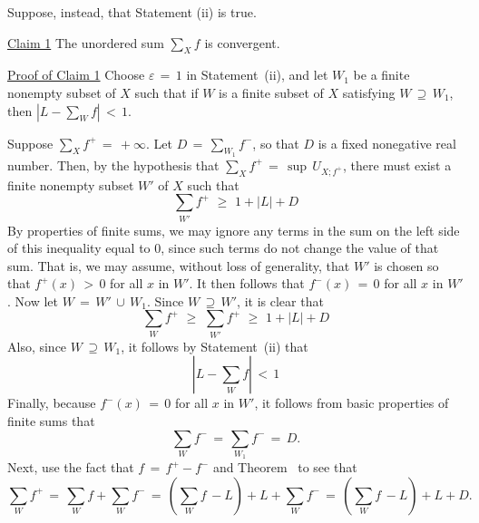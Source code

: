 \V

        Suppose, instead, that Statement (ii) is true.

        \underline{Claim 1} The unordered sum ${\sum}_{X} f$ is convergent.

        \underline{Proof of Claim 1} Choose ${\varepsilon} \,=\, 1$ in Statement~(ii),
    and let $W_{1}$ be a finite nonempty subset of $X$ such that if $W$ is a finite subset of $X$ satisfying $W \,{\supseteq}\, W_{{1}}$,
    then $\left|L-{\sum}_{W} f\right|\,<\,1$.

        Suppose ${\sum}_{X} f^{+} \,=\, +{\infty}$. Let $D \,=\, {\sum}_{W_{1}} f^{-}$, so that $D$ is a fixed nonegative real number.
    Then, by the hypothesis that
        ${\displaystyle {\sum}_{X} f^{+} \,=\, {\sup}\,U_{X;f^{+}}}$,
 there must exist a finite nonempty subset $W'$ of $X$ such that
        \begin{displaymath}
        {\sum}_{W'} f^{+}\,\,{\geq}\,\,1+|L| + D
        \end{displaymath}
    By properties of finite sums, we may ignore any terms in the sum on the left side of this inequality equal to $0$,
    since such terms do not change the value of that sum.
    That is, we may assume, without loss of generality, that $W'$ is chosen so that $f^{+}(x)\,>\,0$ for all $x$ in $W'$.
    It then follows that $f^{-}(x) \,=\, 0$ for all $x$ in $W'$.
    Now let $W \,=\, W'\,{\cup}\,W_{1}$.
    Since $W \,{\supseteq}\, W'$, it is clear that
        \begin{displaymath}
        {\sum}_{W} f^{+}\,\,{\geq}\,\,{\sum}_{W'} f^{+}\,\,{\geq}\,\,1+|L|+D
        \end{displaymath}
    Also, since $W \,{\supseteq}\, W_{1}$, it follows by Statement~(ii) that
        \begin{displaymath}
        \left|L-{\sum}_{W} f\right|\,<\,1
        \end{displaymath}
    Finally, because $f^{-}(x) \,=\, 0$ for all $x$ in $W'$, it follows from basic properties of finite sums that
        \begin{displaymath}
        {\sum}_{W} f^{-} \,=\, {\sum}_{W_{1}} f^{-} \,=\, D.
        \end{displaymath}
    Next, use the fact that $f \,=\, f^{+}-f^{-}$ and Theorem~ to see that
        \begin{displaymath}
        {\sum}_{W} f^{+} \,=\, {\sum}_{W} f + {\sum}_{W} f^{-} \,=\, 
    \left({\sum}_{W} f\, -L\right) + L + {\sum}_{W} f^{-} \,=\, 
    \left({\sum}_{W} f\, -L\right) + L + D.
        \end{displaymath}
